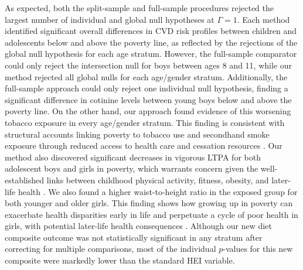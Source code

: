 \documentclass[12pt,leqno,titlepage]{amsart}
\newcommand{\1}{\mathbbm{1}}
\begin{document}
\begin{bibunit}
As expected, both the split-sample and full-sample procedures rejected the largest number of individual and global null hypotheses at $\Gamma=1$. %
Each method identified significant overall differences in CVD risk profiles between children and adolescents below and above the poverty line, as reflected by the rejections of the global null hypothesis for each age stratum. However, the full-sample comparator could only reject the intersection null for boys between ages 8 and 11, while our method rejected all global nulls for each age/gender stratum. Additionally, the full-sample approach could only reject one individual null hypothesis, finding a significant difference in cotinine levels between young boys below and above the poverty line. On the other hand, our approach found evidence of this worsening tobacco exposure in every age/gender stratum.
This finding is consistent with structural accounts linking poverty to tobacco use and
secondhand smoke exposure through reduced access to health care and cessation
resources \citep{marbin2021health}.
Our method also discovered significant decreases in vigorous LTPA for both adolescent boys and girls in poverty, which warrants
concern given the well-established links between childhood physical activity,
fitness, obesity, and later-life health \citep{stodden2008developmental,owens2017case}. 
We also found a higher waist-to-height ratio in the exposed group for both younger and older girls.
This finding shows how growing up in poverty can exacerbate health disparities early in life and perpetuate a cycle of poor health in girls, with potential later-life health consequences 
\citep{kelsey2014age}. Although our new diet composite outcome was not statistically significant in any stratum after correcting for multiple comparisons, most of the individual $p$-values for this new composite were markedly lower than the standard HEI variable.%


\end{bibunit}
\end{document}
